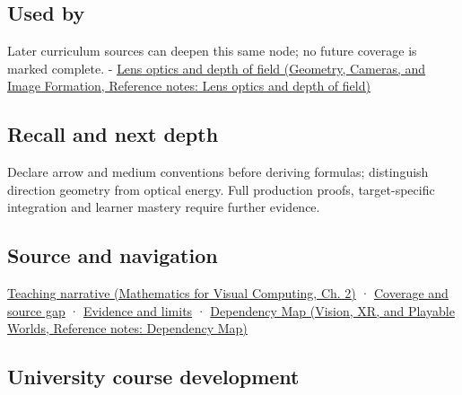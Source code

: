 \subsection{Used by}\label{appendix-44e00863b4d5-used-by}

\hypertarget{appendix-44e00863b4d5-used-by}{}

Later curriculum sources can deepen this same node; no future coverage is marked complete. - \href{../03-Geometry-Cameras-and-Image-Formation/main.pdf\#nameddest=appendix-21f8456e2629}{Lens optics and depth of field (Geometry, Cameras, and Image Formation, Reference notes: Lens optics and depth of field)}

\subsection{Recall and next depth}\label{appendix-44e00863b4d5-recall-and-next-depth}

\hypertarget{appendix-44e00863b4d5-recall-and-next-depth}{}

Declare arrow and medium conventions before deriving formulas; distinguish direction geometry from optical energy. Full production proofs, target-specific integration and learner mastery require further evidence.

\subsection{Source and navigation}\label{appendix-44e00863b4d5-source-and-navigation}

\hypertarget{appendix-44e00863b4d5-source-and-navigation}{}

\href{../02-Mathematics-for-Visual-Computing/main.pdf\#nameddest=01-foundations-i-ch018-light-uses-the-same-decomposition-in-a-new-role}{Teaching narrative (Mathematics for Visual Computing, Ch. 2)} · \hyperref[appendix-fd090d982a15-phase-6---parts-501-600]{Coverage and source gap} · \hyperref[appendix-a103e7846d21-phase-6---source-analysis-and-verification]{Evidence and limits} · \href{../07-Vision-XR-and-Playable-Worlds/main.pdf\#nameddest=appendix-4ad47bdd269a}{Dependency Map (Vision, XR, and Playable Worlds, Reference notes: Dependency Map)}

\subsection{University course development}\label{appendix-44e00863b4d5-university-course-development}

